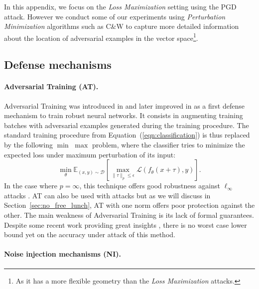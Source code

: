 In this appendix, we focus on the {\em Loss Maximization} setting using the PGD attack. However we  conduct some of our experiments using {\em Perturbation Minimization} algorithms such as C\&W to capture more detailed information about the location of adversarial examples in the vector space\footnote{As it has a more flexible geometry than the {\em Loss Maximization} attacks.}. 

\subsection{Defense mechanisms}
\label{subsec:defense_mechanisms}

\paragraph{Adversarial Training (AT).}
\label{paragraph:adversarial_training}

Adversarial Training was introduced in \cite{goodfellow2014explaining} and later improved in \cite{madry2018towards} as a first defense mechanism to train robust neural networks. It consists in augmenting training batches with adversarial examples generated during the training procedure. The standard training procedure from Equation~(\ref{eqn:classification}) is thus replaced by the following  $\min$ $\max$ problem, where the classifier tries to minimize the expected loss under maximum perturbation of its input:
\begin{equation}
    \min_{\theta}\mathbb{E}_{(x, y)\sim \mathcal{D}} \left[ \max_{\lVert\tau\rVert_p \leq \epsilon} \mathcal{L} \left( f_{\theta}(x+\tau), y \right) \right].
\end{equation}
\noindent
In the case where $p=\infty$, this technique offers good robustness  against $\ell_\infty$ attacks \cite{athalye2018obfuscated}. AT can also be used with \ltwo attacks but as we will discuss in Section~\ref{sec:no_free_lunch}, AT with one norm offers poor protection against the other.
The main weakness of Adversarial Training is its lack of formal guarantees. Despite some recent work providing great insights \cite{sinha2017certifying,zhang2019theoretically}, there is no worst case lower bound yet on the accuracy under attack of this method.


\paragraph{Noise injection mechanisms (NI).}\label{subsec:randomized_training}



